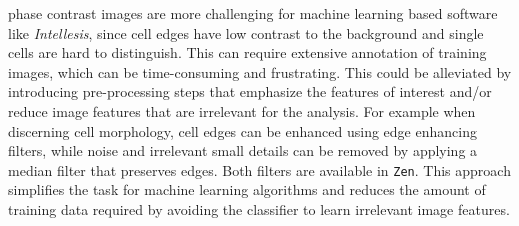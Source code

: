 phase
contrast images are more challenging for machine learning based software like
\textit{Intellesis}, since cell edges have low contrast to the background and
single cells are hard to distinguish. This can require extensive annotation of
training images, which can be time-consuming and frustrating. This could be
alleviated by introducing pre-processing steps that emphasize the features of
interest and/or reduce image features that are irrelevant for the analysis. For
example when discerning cell morphology, cell edges can be enhanced using edge
enhancing filters, while noise and irrelevant small details can be removed by
applying a median filter that preserves edges. Both filters are available in
\texttt{Zen}. This approach simplifies the task for machine learning algorithms
and reduces the amount of training data required by avoiding the classifier to
learn irrelevant image features.






















